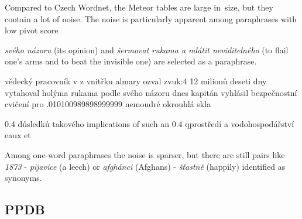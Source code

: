 Compared to Czech Wordnet, the Meteor tables are large in~size, but they 
contain a lot of noise. The noise is particularly apparent among paraphrases 
with low pivot score

\textit{svého názoru}  (its opinion) and \textit{šermovat rukama a 
mlátit neviditelného} (to flail one's arms and to beat the invisible one) are 
selected as a paraphrase. 

vědecký pracovník v     z vnitřku almary ozval zvuk:4
12 milionů      deseti dny vytahoval holýma rukama
podle svého názoru      dnes kapitán vyhlásil bezpečnostní cvičení pro
.010100989898999999    nemoudré        okrouhlá skla

0.4    důsledků takového       implications of such an
0.4	 qprostředí a vodohospodářství    eaux et

Among one-word paraphrases the noise is sparser, but there are still pairs like 
\textit{1873} - \textit{pijavice} (a leech) or \textit{afgh\'{a}nci} (Afghans) - 
\textit{š\v{t}astně} (happily) identified as synonyms. 




\subsection{PPDB} 